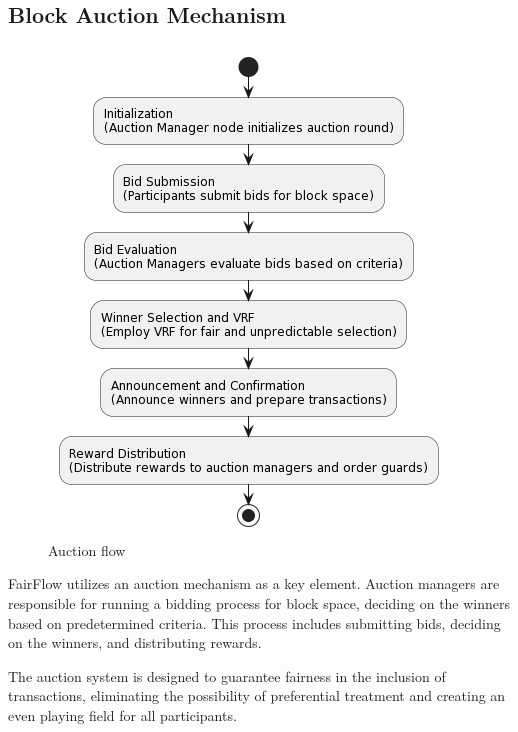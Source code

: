 \documentclass{article}
\begin{document}
\subsection{Block Auction Mechanism}

\begin{figure}[h]
    \centering
    \includegraphics[width=0.4\linewidth]{diagram_freeflow_2.png}
    \caption{Auction flow}
    \label{fig:enter-label}
\end{figure}

FairFlow utilizes an auction mechanism as a key element. Auction managers are responsible for running a bidding process for block space, deciding on the winners based on predetermined criteria. This process includes submitting bids, deciding on the winners, and distributing rewards.

The auction system is designed to guarantee fairness in the inclusion of transactions, eliminating the possibility of preferential treatment and creating an even playing field for all participants.
\end{document}
